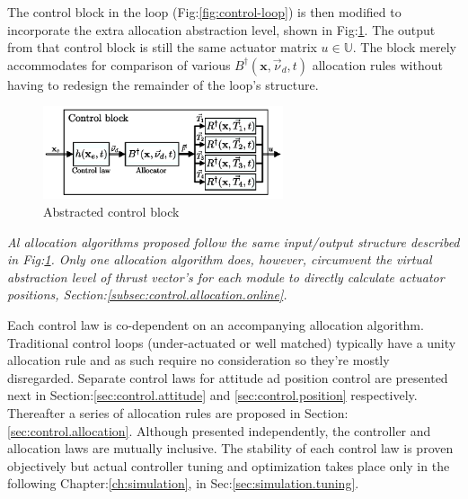 The control block in the loop (Fig:\ref{fig:control-loop}) is then modified to incorporate the extra allocation abstraction level, shown in Fig:\ref{fig:control-block}. The output from that control block is still the same actuator matrix $u\in\mathbb{U}$. The block merely accommodates for comparison of various $B^\dagger(\mathbf{x},\vec{\nu}_d,t)$ allocation rules without having to redesign the remainder of the loop's structure.
\begin{figure}[htbp]
\centering
\includegraphics[width=0.63\textwidth]{figs/control-block}
\caption{Abstracted control block}
\label{fig:control-block}
\vspace{-15pt}
\end{figure}
\par
\emph{\color{Gray} Al allocation algorithms proposed follow the same input/output structure described in Fig:\ref{fig:control-block}. Only one allocation algorithm does, however, circumvent the virtual abstraction level of thrust vector's for each module to directly calculate actuator positions, Section:\ref{subsec:control.allocation.online}.}
\par
Each control law is co-dependent on an accompanying allocation algorithm. Traditional control loops (under-actuated or well matched) typically have a unity allocation rule and as such require no consideration so they're mostly disregarded. Separate control laws for attitude ad position control are presented next in Section:\ref{sec:control.attitude} and \ref{sec:control.position} respectively. Thereafter a series of allocation rules are proposed in Section:\ref{sec:control.allocation}. Although presented independently, the controller and allocation laws are mutually inclusive. The stability of each control law is proven objectively but actual controller tuning and optimization takes place only in the following Chapter:\ref{ch:simulation}, in Sec:\ref{sec:simulation.tuning}.
\par
